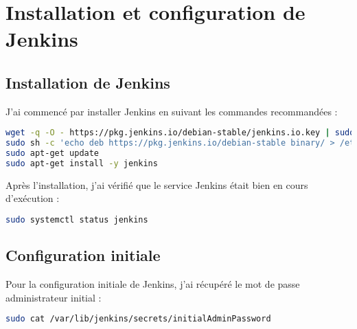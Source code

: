 \documentclass{article}
\begin{document}
\section{Installation et configuration de Jenkins}
\subsection{Installation de Jenkins}


J'ai commencé par installer Jenkins en suivant les commandes recommandées :

\begin{lstlisting}[language=bash]
wget -q -O - https://pkg.jenkins.io/debian-stable/jenkins.io.key | sudo apt-key add -
sudo sh -c 'echo deb https://pkg.jenkins.io/debian-stable binary/ > /etc/apt/sources.list.d/jenkins.list'
sudo apt-get update
sudo apt-get install -y jenkins
\end{lstlisting}

Après l'installation, j'ai vérifié que le service Jenkins était bien en cours d'exécution :

\begin{lstlisting}[language=bash]
sudo systemctl status jenkins
\end{lstlisting}

\subsection{Configuration initiale}
Pour la configuration initiale de Jenkins, j'ai récupéré le mot de passe administrateur initial :

\begin{lstlisting}[language=bash]
sudo cat /var/lib/jenkins/secrets/initialAdminPassword
\end{lstlisting}

\end{document}
